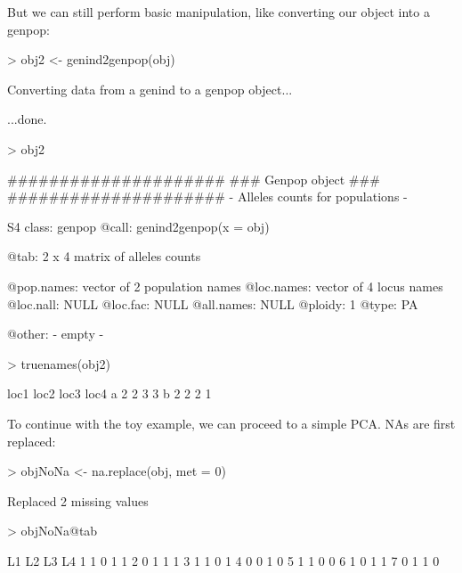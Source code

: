 \documentclass{article}
\begin{document}
\noindent But we can still perform basic manipulation, like converting
our object into a genpop:
\begin{Schunk}
\begin{Sinput}
> obj2 <- genind2genpop(obj)
\end{Sinput}
\begin{Soutput}
 Converting data from a genind to a genpop object... 

...done.
\end{Soutput}
\begin{Sinput}
> obj2
\end{Sinput}
\begin{Soutput}
       #####################
       ### Genpop object ### 
       #####################
- Alleles counts for populations - 

S4 class:  genpop
@call: genind2genpop(x = obj)

@tab:  2 x 4 matrix of alleles counts

@pop.names: vector of  2 population names
@loc.names: vector of  4 locus names
@loc.nall: NULL
@loc.fac: NULL
@all.names: NULL
@ploidy:  1
@type:  PA

@other: - empty -
\end{Soutput}
\begin{Sinput}
> truenames(obj2)
\end{Sinput}
\begin{Soutput}
  loc1 loc2 loc3 loc4
a    2    2    3    3
b    2    2    2    1
\end{Soutput}
\end{Schunk}

\noindent To continue with the toy example, we can proceed to a simple PCA.
NAs are first replaced:
\begin{Schunk}
\begin{Sinput}
> objNoNa <- na.replace(obj, met = 0)
\end{Sinput}
\begin{Soutput}
 Replaced 2 missing values 
\end{Soutput}
\begin{Sinput}
> objNoNa@tab
\end{Sinput}
\begin{Soutput}
  L1 L2 L3 L4
1  1  0  1  1
2  0  1  1  1
3  1  1  0  1
4  0  0  1  0
5  1  1  0  0
6  1  0  1  1
7  0  1  1  0
\end{Soutput}
\end{Schunk}
\end{document}
